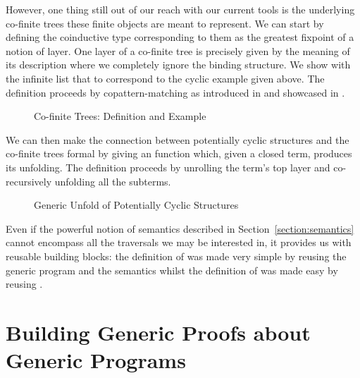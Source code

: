 However, one thing still out of our reach with our current tools
is the underlying co-finite trees these finite objects are meant
to represent. We can start by defining the coinductive type
corresponding to them as the greatest fixpoint of a notion of
layer. One layer of a co-finite tree is precisely given by the
meaning of its description where we completely ignore the binding
structure. We show with  the infinite list that to
correspond to the cyclic example  given above. The definition
proceeds by copattern-matching as introduced in \cite{abel2013copatterns}
and showcased in \cite{thibodeau2016case}.

\begin{figure}[h]
\begin{minipage}{0.55\textwidth}
\end{minipage}\hspace{2em}
\begin{minipage}{0.35\textwidth}
\end{minipage}
\caption{Co-finite Trees: Definition and Example}
\end{figure}

We can then make the connection between potentially cyclic
structures and the co-finite trees formal by giving an 
function which, given a closed term, produces its unfolding.
The definition proceeds by unrolling the term's top layer and
co-recursively unfolding all the subterms.

\begin{figure}[h]
\caption{Generic Unfold of Potentially Cyclic Structures}
\end{figure}

Even if the
powerful notion of semantics described in Section~\ref{section:semantics}
cannot encompass all the traversals we may be interested in,
it provides us with reusable building blocks: the definition
of  was made very simple by reusing the generic
program  and the  semantics whilst
the definition of  was made easy by reusing .



\section{Building Generic Proofs about Generic Programs}

